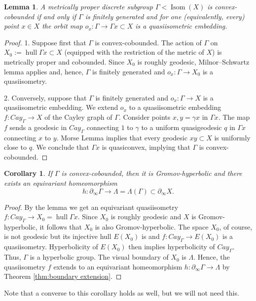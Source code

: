 \documentclass[12pt]{amsbook}%
\newtheorem{lem}[thm]{Lemma}
\newtheorem{cor}[thm]{Corollary}
\theoremstyle{definition}
\theoremstyle{remark}
\numberwithin{section}{chapter}
\numberwithin{subsection}{section}
\numberwithin{figure}{chapter}
\DeclareMathOperator{\Isom}{Isom}
\DeclareMathOperator{\hull}{hull}
\def\Ga{\Gamma}
\def\ga{\gamma}
\def\La{\Lambda}
\def\geo{\partial_\infty}
\begin{document}
\begin{lem}
A metrically proper  discrete subgroup $\Ga< \Isom(X)$ is convex-cobounded if and only if $\Ga$ is finitely generated 
and for one (equivalently, every) point $x\in X$ the orbit map $o_x: \Ga\to \Ga x\subset X$ is a  quasiisometric embedding. 
\end{lem}
\begin{proof} 1. Suppose first that $\Ga$ is convex-cobounded. The action of $\Ga$ on $X_0:=\hull \Ga x\subset X$ (equipped with the restriction of the metric of $X$) is metrically proper and cobounded. Since $X_0$ is roughly geodesic, Milnor--Schwartz lemma applies and, hence, $\Ga$ is finitely generated and $o_x:  \Ga\to X_0$ is a quasiisometry. 

2. Conversely, suppose that $\Ga$ is finitely generated and $o_x: \Ga\to X$ is a  quasiisometric embedding. We extend 
$o_x$ to a quasiisometric embedding $f: Cay_\Ga\to X$ of the Cayley graph of $\Ga$. Consider points $x, y=\ga x$ in $\Ga x$. The map $f$ sends a geodesic in $Cay_\Ga$ connecting $1$ to $\ga$ to a uniform quasigeodesic $q$ in $\Ga x$ connecting $x$ to $y$.  Morse Lemma implies that every geodesic $xy\subset X$ is uniformly close to $q$. We conclude that $\Ga x$ is quasiconvex, implying that $\Ga$ is convex-cobounded. 
\end{proof}

\begin{cor}\label{cor:boundary map}
If $\Ga$ is convex-cobounded, then it is Gromov-hyperbolic and there exists an equivariant homeomorphism
$$
h: \geo \Ga\to \La=\La(\Ga)\subset \geo X. 
$$
\end{cor}
\begin{proof} By the lemma we get an equivariant quasiisometry $f: Cay_\Ga\to X_0= \hull \Ga x$. Since $X_0$ is roughly geodesic and $X$ is Gromov-hyperbolic, it follows that $X_0$ is also Gromov-hyperbolic. The space $X_0$, of course, is not geodesic but its injective hull $E(X_0)$ is and $f: Cay_\Ga\to E(X_0)$ is a quasiisometry. Hyperbolicity of $E(X_0)$ then implies hyperbolicity of $Cay_\Ga$. Thus, $\Ga$ is a hyperbolic group. The visual boundary of 
$X_0$ is $\La$.  Hence, the quasiisometry $f$ extends to an equivariant homeomorphism $h: \geo \Ga\to \La$ by Theorem \ref{thm:boundary extension}. 
\end{proof}

Note that a converse to this corollary holds as well, but we will not need this.  
\end{document}
